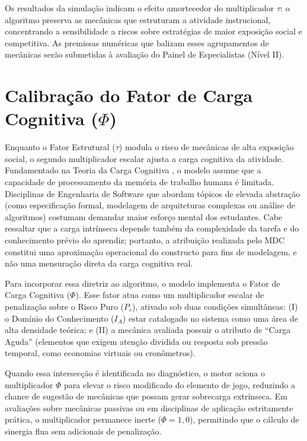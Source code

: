 Os resultados da simulação indicam o efeito amortecedor do multiplicador $\tau$: o algoritmo preserva as mecânicas que estruturam a atividade instrucional, concentrando a sensibilidade a riscos sobre estratégias de maior exposição social e competitiva. As premissas numéricas que balizam esses agrupamentos de mecânicas serão submetidas à avaliação do Painel de Especialistas (Nível II).


\section{Calibração do Fator de Carga Cognitiva ($\Phi$)}

Enquanto o Fator Estrutural ($\tau$) modula o risco de mecânicas de alta exposição social, o segundo multiplicador escalar ajusta a carga cognitiva da atividade. Fundamentado na Teoria da Carga Cognitiva \cite{sweller1988cognitive}, o modelo assume que a capacidade de processamento da memória de trabalho humana é limitada. Disciplinas de Engenharia de Software que abordam tópicos de elevada abstração (como especificação formal, modelagem de arquiteturas complexas ou análise de algoritmos) costumam demandar maior esforço mental dos estudantes. Cabe ressaltar que a carga intrínseca depende também da complexidade da tarefa e do conhecimento prévio do aprendiz; portanto, a atribuição realizada pelo MDC constitui uma aproximação operacional do constructo para fins de modelagem, e não uma mensuração direta da carga cognitiva real.

Para incorporar essa diretriz ao algoritmo, o modelo implementa o Fator de Carga Cognitiva ($\Phi$). Esse fator atua como um multiplicador escalar de penalização sobre o Risco Puro ($P_c$), ativado sob duas condições simultâneas: (I) o Domínio do Conhecimento ($I_A$) estar catalogado no sistema como uma área de alta densidade teórica; e (II) a mecânica avaliada possuir o atributo de ``Carga Aguda'' (elementos que exigem atenção dividida ou resposta sob pressão temporal, como economias virtuais ou cronômetros).

Quando essa intersecção é identificada no diagnóstico, o motor aciona o multiplicador $\Phi$ para elevar o risco modificado do elemento de jogo, reduzindo a chance de sugestão de mecânicas que possam gerar sobrecarga extrínseca. Em avaliações sobre mecânicas passivas ou em disciplinas de aplicação estritamente prática, o multiplicador permanece inerte ($\Phi = 1,0$), permitindo que o cálculo de sinergia flua sem adicionais de penalização.

